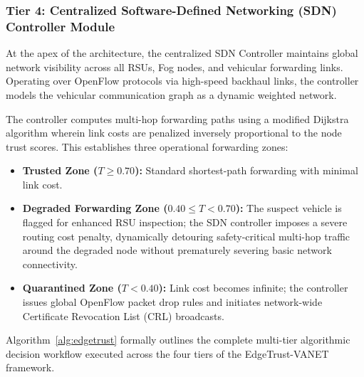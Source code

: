 \documentclass[conference]{IEEEtran}
\begin{document}
\subsubsection{Tier 4: Centralized Software-Defined Networking (SDN) Controller Module}
At the apex of the architecture, the centralized SDN Controller maintains global network visibility across all RSUs, Fog nodes, and vehicular forwarding links. Operating over OpenFlow protocols via high-speed backhaul links, the controller models the vehicular communication graph as a dynamic weighted network. 

The controller computes multi-hop forwarding paths using a modified Dijkstra algorithm wherein link costs are penalized inversely proportional to the node trust scores. This establishes three operational forwarding zones:
\begin{itemize}
    \item \textbf{Trusted Zone ($T \ge 0.70$):} Standard shortest-path forwarding with minimal link cost.
    \item \textbf{Degraded Forwarding Zone ($0.40 \le T < 0.70$):} The suspect vehicle is flagged for enhanced RSU inspection; the SDN controller imposes a severe routing cost penalty, dynamically detouring safety-critical multi-hop traffic around the degraded node without prematurely severing basic network connectivity.
    \item \textbf{Quarantined Zone ($T < 0.40$):} Link cost becomes infinite; the controller issues global OpenFlow packet drop rules and initiates network-wide Certificate Revocation List (CRL) broadcasts.
\end{itemize}

Algorithm~\ref{alg:edgetrust} formally outlines the complete multi-tier algorithmic decision workflow executed across the four tiers of the EdgeTrust-VANET framework.
\end{document}
